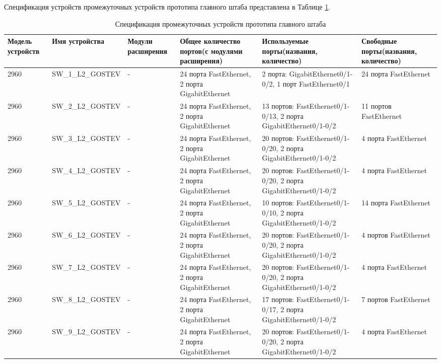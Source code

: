 \documentclass[14pt, a4paper]{extarticle}
\numberwithin{equation}{section}
\begin{document}
\begin{landscape}
Спецификация устройств промежуточных устройств прототипа главного штаба представлена в Таблице \ref{table:mainDepDevicesSpecs}.

\begin{table}[H]
\centering
\small
\caption{Спецификация промежуточных устройств прототипа главного штаба}
\begin{tabular}{|m{2.5cm}|m{4cm}|m{2.5cm}|m{4.2cm}|m{5.3cm}|m{4cm}|}
\hline
\textbf{Модель устройств} & \textbf{Имя устройства} & \textbf{Модули расширения} & \textbf{Общее количество портов(с модулями расширения)} & \textbf{Используемые порты(названия, количество)} & \textbf{Свободные порты(названия, количество)} \\
\hline
2960 & 
SW\_1\_L2\_GOSTEV & 
- & 
24 порта FastEthernet, 2 порта GigabitEthernet 
& 2 порта: GigabitEthernet0/1-0/2, 1 порт FastEthernet0/1 
& 24 порта FastEthernet \\
\hline
2960 & 
SW\_2\_L2\_GOSTEV & 
- & 
24 порта FastEthernet, 2 порта GigabitEthernet & 
13 портов: FastEthernet0/1-0/13, 2 порта GigabitEthernet0/1-0/2 & 
11 портов FastEthernet \\
\hline
2960 &
SW\_3\_L2\_GOSTEV &
- &
24 порта FastEthernet, 2 порта GigabitEthernet &
20 портов: FastEthernet0/1-0/20, 2 порта GigabitEthernet0/1-0/2 &
4 порта FastEthernet \\
\hline
2960 &
SW\_4\_L2\_GOSTEV &
- &
24 порта FastEthernet, 2 порта GigabitEthernet &
20 портов: FastEthernet0/1-0/20, 2 порта GigabitEthernet0/1-0/2 &
4 порта FastEthernet \\
\hline
2960 &
SW\_5\_L2\_GOSTEV &
- &
24 порта FastEthernet, 2 порта GigabitEthernet &
10 портов: FastEthernet0/1-0/10, 2 порта GigabitEthernet0/1-0/2 &
14 порта FastEthernet \\
\hline
2960 &
SW\_6\_L2\_GOSTEV &
- &
24 порта FastEthernet, 2 порта GigabitEthernet &
20 портов: FastEthernet0/1-0/20, 2 порта GigabitEthernet0/1-0/2 &
4 портов FastEthernet \\
\hline
2960 &
SW\_7\_L2\_GOSTEV &
- &
24 порта FastEthernet, 2 порта GigabitEthernet &
20 портов: FastEthernet0/1-0/20, 2 порта GigabitEthernet0/1-0/2 &
4 порта FastEthernet \\
\hline
2960 &
SW\_8\_L2\_GOSTEV &
- &
24 порта FastEthernet, 2 порта GigabitEthernet &
17 портов: FastEthernet0/1-0/17, 2 порта GigabitEthernet0/1-0/2 &
7 портов FastEthernet \\
\hline
2960 &
SW\_9\_L2\_GOSTEV &
- &
24 порта FastEthernet, 2 порта GigabitEthernet &
20 портов: FastEthernet0/1-0/20, 2 порта GigabitEthernet0/1-0/2 &
4 порта FastEthernet \\
\end{tabular}
\label{table:mainDepDevicesSpecs}
\end{table}
\end{landscape}
\end{document}
